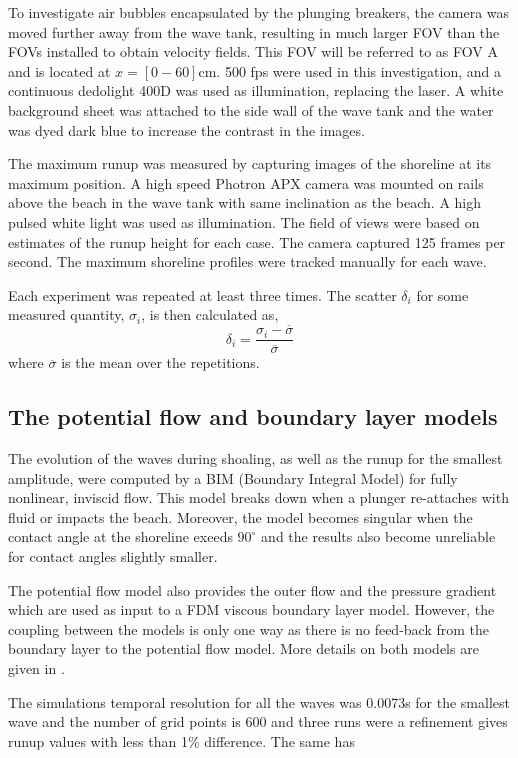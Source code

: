 \documentclass[review]{elsarticle}
\newcommand{\sidenote}[1]{\marginpar{\footnotesize #1}}
\begin{document}
To investigate air bubbles encapsulated by the plunging breakers, the camera was moved further away from the wave tank, resulting in much larger FOV than the FOVs installed to obtain velocity fields. This FOV will be referred to as FOV A and is located at $x=[0-60]$cm.  500 fps were used in this investigation, and a continuous dedolight 400D was used as illumination, replacing the laser. A white background sheet was attached to the side wall of  the wave tank and the water was dyed dark blue to increase the contrast in the images.

The maximum runup was measured by capturing images of the shoreline at its maximum position. A high speed Photron APX  camera was mounted on rails above the beach in the wave tank with same inclination as the beach. A high pulsed white light was used as illumination. The field of views were based on estimates of the runup height for each case. The camera captured 125 frames per second. The maximum shoreline profiles were tracked manually for each wave.


Each experiment was repeated at least three times.
The scatter $\delta_i$ for some measured quantity, $\sigma_i$, is then calculated as,
\begin{equation}
\delta_i=\frac{\sigma_i-\overline{\sigma}}{\overline{\sigma}}
\end{equation}
where $\overline{\sigma}$ is the mean over the  repetitions.

\subsection{The potential flow and boundary layer models}
The evolution of the waves during shoaling, as well as the runup for the smallest amplitude, were 
computed by a BIM (Boundary Integral Model) for fully nonlinear, inviscid flow.
This model breaks down when a plunger re-attaches with fluid or impacts the beach. Moreover, the
model  becomes singular when the contact angle at the shoreline exeeds $90^\circ$  and the results also become unreliable for contact angles slightly smaller.  

The potential flow model also provides the outer flow and the pressure gradient
which are used as input to a FDM viscous boundary layer model. However, the coupling between the
models is only one way as there is no feed-back from the boundary layer to the potential
flow model. 
More details on both models are given in  \cite{pedersen2013runup}.

The simulations temporal resolution for all the waves was 0.0073s for the smallest wave and the number of grid points is 600 and three runs were a refinement gives runup values with less than 1\% difference. The same has 
\sidenote{Grid refinement?}   
 
\end{document}

